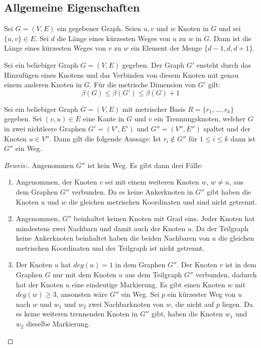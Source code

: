 \subsection{Allgemeine Eigenschaften}
\begin{lem}\cite{landmarks}
\label{dist}
Sei $G=(V,E)$ ein gegebener Graph. Seien $u,v$ und $w$ Knoten in $G$ und sei $\{u,v\}\in E$. Sei $d$ die Länge eines kürzesten Weges von $u$ zu $w$ in $G$. Dann ist die Länge eines kürzesten Weges von $v$ zu $w$ ein Element der Menge $\{d-1,d,d+1\}$.
\end{lem}
\begin{lem}
\cite{bases}
\label{einelementreichtnicht}
Sei ein beliebiger Graph $G=(V,E)$ gegeben. Der Graph $G'$ ensteht durch das Hinzufügen eines Knotens und das Verbinden von diesem Knoten mit genau einem anderen Knoten in $G$. Für die metrische Dimension von $G'$ gilt:
$$\beta(G)\leq \beta(G')\leq \beta(G)+1$$ 
\end{lem}
\begin{lem}
\label{wegtrennungsknoten}
\label{first_theorem}
Sei ein beliebiger Graph $G=(V,E)$ mit metrischer Basis $R=\{r_1, \ldots, r_k\}$ gegeben. Sei $(v,u) \in E$ eine Kante in $G$ und $v$ ein Trennungsknoten, welcher $G$ in zwei nichtleere Graphen $G'=(V',E')$ und $G''=(V'',E'')$ spaltet und der Knoten $u \in V''$. Dann gilt die folgende Aussage:\newline
Ist $r_i \notin G''$ für $1 \leq i \leq k$ dann ist $G''$ ein Weg.
\end{lem}
\begin{proof}[Beweis:]
Angenommen $G''$ ist kein Weg. Es gibt dann drei Fälle:
\begin{enumerate}
\item Angenommen, der Knoten $v$ sei mit einem weiteren Knoten $w$, $w \neq u$, aus dem Graphen $G''$ verbunden. Da es keine Ankerknoten in $G''$ gibt haben die Knoten $u$ und $w$ die gleichen metrischen Koordinaten und sind nicht getrennt.
\item Angenommen, $G''$ beinhaltet keinen Knoten mit Grad eins. Jeder Knoten hat mindestens zwei Nachbarn und damit auch der Knoten $u$. Da der Teilgraph keine Ankerknoten beinhaltet haben die beiden Nachbaren von $u$ die gleichen metrischen Koordinaten und der Teilgraph ist nicht getrennt.
\item Der Knoten $u$ hat $deg(u)=1$ in dem Graphen $G''$. Der Knoten $v$ ist in dem Graphen $G$ nur mit dem Knoten $u$ aus dem Teilgraph $G''$ verbunden, dadurch hat der Knoten $u$ eine eindeutige Markierung. Es gibt einen Knoten $w$ mit $deg(w) \geq 3$, ansonsten wäre $G''$ ein Weg. Sei $p$ ein kürzester Weg von $u$ nach $w$ und $w_1$ und $w_2$ zwei Nachbarknoten von $w$, die nicht auf $p$ liegen. Da es keine weiteren trennenden Knoten in $G''$ gibt, haben die Knoten $w_1$ und $w_2$ dieselbe Markierung.   
\end{enumerate}
\vspace{-2mm}
\end{proof}

